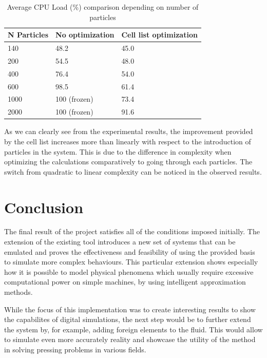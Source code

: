 \documentclass[]{usiinfbachelorproject}
\begin{document}
\begin{table}[h]
\centering
{} {
\begin{normalsize}\begin{tabular}{l|ll}
\textbf{N Particles} & \textbf{No optimization} & \textbf{Cell list optimization}\\
\hline
140 & 48.2 & 45.0 \\
200 & 54.5 & 48.0 \\
400 & 76.4 & 54.0 \\ 
600 & 98.5 & 61.4 \\
1000 & 100 (frozen) & 73.4\\
2000 & 100 (frozen) & 91.6 \\
\end{tabular}
\end{normalsize}
}
\caption{Average CPU Load (\%) comparison depending on number of particles}
\label{tab:CPULoad}
\end{table}
  
As we can clearly see from the experimental results, the improvement provided by the 
cell list increases more than linearly with respect to the introduction of particles in the system. 
This is due to the difference in complexity when 
optimizing the calculations comparatively to going through each particles. The switch from 
quadratic to linear complexity can be noticed in the observed results.

\newpage
\section{Conclusion}

The final result of the project satisfies all of the conditions imposed initially. The extension of the 
existing tool introduces a new set of systems that can be emulated and proves the effectiveness and 
feasibility of using the provided basis to simulate more complex behaviours. This particular extension shows 
especially how it is possible to model physical phenomena which usually require excessive computational power 
on simple machines, by using intelligent approximation methods.

While the focus of this implementation was to create interesting results to show the 
capabilites of digital simulations, the next step would be to further extend the system 
by, for example, adding foreign elements to the fluid. This would allow to simulate even 
more accurately reality and showcase the utility of the method in solving pressing problems in 
various fields.
\end{document}

